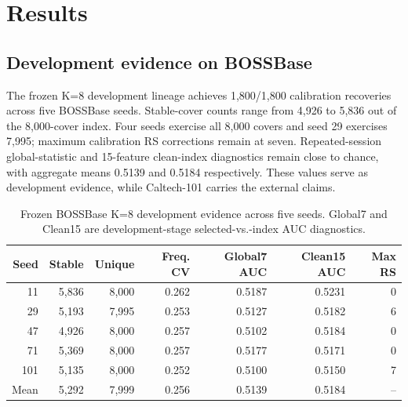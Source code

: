\section{Results}
\label{sec:results}

\subsection{Development evidence on BOSSBase}
\label{sec:bossdev}

The frozen K=8 development lineage achieves 1,800/1,800 calibration recoveries across five BOSSBase seeds. Stable-cover counts range from 4,926 to 5,836 out of the 8,000-cover index. Four seeds exercise all 8,000 covers and seed 29 exercises 7,995; maximum calibration RS corrections remain at seven. Repeated-session global-statistic and 15-feature clean-index diagnostics remain close to chance, with aggregate means 0.5139 and 0.5184 respectively. These values serve as development evidence, while Caltech-101 carries the external claims.

\begin{table}[t]
\caption{Frozen BOSSBase K=8 development evidence across five seeds. Global7 and Clean15 are development-stage selected-vs.-index AUC diagnostics.}
\label{tab:boss-dev}
\small
\begin{tabular}{@{}rrrrrrr@{}}
\toprule
Seed & Stable & Unique & Freq. CV & Global7 AUC & Clean15 AUC & Max RS \\
\midrule
11  & 5,836 & 8,000 & 0.262 & 0.5187 & 0.5231 & 0 \\
29  & 5,193 & 7,995 & 0.253 & 0.5127 & 0.5182 & 6 \\
47  & 4,926 & 8,000 & 0.257 & 0.5102 & 0.5184 & 0 \\
71  & 5,369 & 8,000 & 0.257 & 0.5177 & 0.5171 & 0 \\
101 & 5,135 & 8,000 & 0.252 & 0.5100 & 0.5150 & 7 \\
\midrule
Mean & 5,292 & 7,999 & 0.256 & 0.5139 & 0.5184 & -- \\
\bottomrule
\end{tabular}
\end{table}

